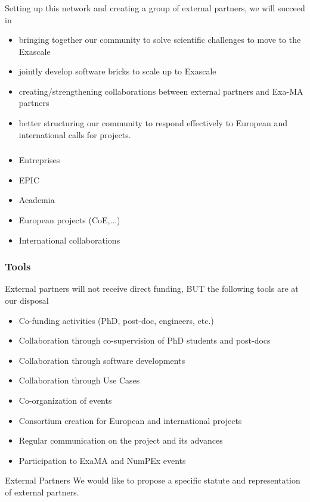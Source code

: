 \begin{frame}
  \frametitle{\insertsectionhead}
  \framesubtitle{\insertsubsectionhead}

  Setting up this network and creating a group of external partners, we will succeed in
  \begin{itemize}
    \item bringing together our community to solve scientific challenges to move to the Exascale
    \item jointly develop software bricks to scale up to Exascale
    \item creating/strengthening collaborations between external partners and Exa-MA partners 
    \item better structuring our community to respond effectively to European and international calls for projects.
  \end{itemize}

\end{frame}
\begin{frame}
  \frametitle{\insertsectionhead}
  \framesubtitle{\insertsubsectionhead}
  \begin{alertblock}{}
    \begin{itemize}
      \item Entreprises
      \item EPIC
      \item Academia
      \item European projects (CoE,...)
      \item International collaborations
    \end{itemize}
  \end{alertblock}


\end{frame}

\begin{frame}
  \frametitle{Tools}

  External partners will not receive direct funding, BUT the following tools are at our disposal

\begin{itemize}
  \item Co-funding activities (PhD, post-doc, engineers, etc.)
  \item Collaboration through co-supervision of PhD students and post-docs
  \item Collaboration through software developments
  \item Collaboration through Use Cases
  \item Co-organization of events
  \item Consortium creation for European and international projects
  \item Regular communication on the project and its advances
  \item Participation to ExaMA and NumPEx events
\end{itemize}

\begin{alertblock}{External Partners}
 We would like to propose a specific statute and representation of external partners.
\end{alertblock}
  
\end{frame}


